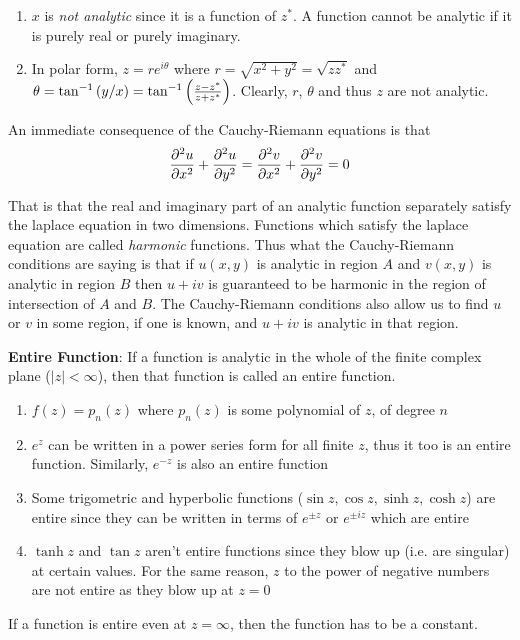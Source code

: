\documentclass[12pt, letterpaper]{book}
\begin{document}
\begin{enumerate}
    \item $x$ is \emph{not analytic} since it is a function of $z^*$. A function cannot be analytic if it is purely real or purely imaginary. 
    \item In polar form, $z= re^{i\theta}$ where $r= \sqrt{x^2+y^2}= \sqrt{zz^*}$ and $\theta= \tan^{-1}\qty(y/x)= \tan^{-1}\qty(\frac{z-z^*}{z+z^*})$. Clearly, $r$, $\theta$ and thus $z$ are not analytic. 
\end{enumerate}

An immediate consequence of the Cauchy-Riemann equations is that $$\pdv[2]{u}{x}+ \pdv[2]{u}{y}= \pdv[2]{v}{x}+\pdv[2]{v}{y}= 0$$

That is that the real and imaginary part of an analytic function separately satisfy the laplace equation in two dimensions. Functions which satisfy the laplace equation are called \emph{harmonic} functions. Thus what the Cauchy-Riemann conditions are saying is that if $u(x,y)$ is analytic in region $A$ and $v(x,y)$ is analytic in region $B$ then $u+iv$ is guaranteed to be harmonic in the region of intersection of $A$ and $B$. The Cauchy-Riemann conditions also allow us to find $u$ or $v$ in some region, if one is known, and $u+iv$ is analytic in that region.

\textbf{Entire Function}: If a function is analytic in the whole of the finite complex plane ($|z|<\infty$), then that function is called an entire function.

\begin{enumerate}
    \item $f(z)= p_n(z)$ where $p_n(z)$ is some polynomial of $z$, of degree $n$
    \item $e^z$ can be written in a power series form for all finite $z$, thus it too is an entire function. Similarly, $e^{-z}$ is also an entire function
    \item Some trigometric and hyperbolic functions ($\sin z, \cos z, \sinh z, \cosh z$) are entire since they can be written in terms of $e^{\pm z}$ or $e^{\pm iz}$ which are entire
    \item $\tanh z$ and $\tan z$ aren't entire functions since they blow up (i.e. are singular) at certain values. For the same reason, $z$ to the power of negative numbers are not entire as they blow up at $z=0$
\end{enumerate}

If a function is entire even at $z= \infty$, then the function has to be a constant. 
\end{document}

